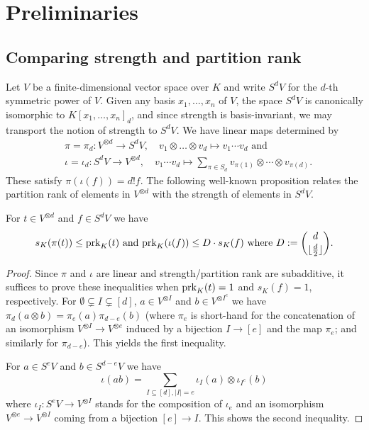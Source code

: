 \documentclass{amsart}
\newcommand{\prk}{\textnormal{prk}}
\newcommand{\floor}[1]{\lfloor #1 \rfloor}
\begin{document}
\section{Preliminaries}
\subsection{Comparing strength and partition rank}

Let $V$ be a finite-dimensional vector space over $K$ and write $S^d V$
for the $d$-th symmetric power of $V$. Given any basis $x_1,\ldots,x_n$ of
$V$, the space $S^d V$ is canonically isomorphic to $K[x_1,\ldots,x_n]_d$,
and since strength is basis-invariant, we may transport the notion of
strength to $S^d V$. We have linear maps determined by 
\begin{align*} 
&\pi=\pi_d: V^{\otimes d} \to S^d V, \quad 
v_1 \otimes \ldots \otimes v_d \mapsto v_1 \cdots v_d  \text{ and}\\
&\iota=\iota_d: S^d V \to V^{\otimes d}, \quad v_1 \cdots v_d \mapsto \sum_{\pi \in S_d}
v_{\pi(1)} \otimes \cdots \otimes v_{\pi(d)}.
\end{align*}
These satisfy $\pi(\iota(f))=d! f$.  The following well-known proposition
relates the partition rank of elements in $V^{\otimes d}$ with the
strength of elements in $S^d V$.

\begin{prop} \label{prop:Sym}
For $t \in V^{\otimes d}$ and $f \in S^d V$ we have
\[ s_K(\pi(t)) \leq \prk_K(t) \text{ and }\prk_K(\iota(f)) \leq
D\cdot s_K(f) \text{ where } D:=\binom{d}{\floor{\frac{d}{2}}}. \]
\end{prop}

\begin{proof}
Since $\pi$ and $\iota$ are linear and strength/partition rank are
subadditive, it suffices to prove these inequalities when $\prk_K(t)=1$
and $s_K(f)=1$, respectively. For $\emptyset \subsetneq I \subsetneq [d]$, $a \in V^{\otimes
I}$ and $b \in V^{\otimes I^c}$
we have $\pi_d(a \otimes b)=\pi_e(a) \pi_{d-e}(b)$ (where $\pi_e$ is
short-hand for the concatenation of an isomorphism $V^{\otimes I} \to V^{\otimes
e}$ induced by a bijection $I \to [e]$ and the map $\pi_e$; and
similarly for $\pi_{d-e}$). This yields the first inequality.

For $a \in S^{e} V$ and $b \in S^{d-e} V$ we have 
\[ \iota(ab)=\sum_{I \subseteq [d],|I|=e} \iota_I(a) \otimes
\iota_{I^c}(b) \]
where $\iota_I: S^e V \to V^{\otimes I}$ stands for the composition of $\iota_e$
and an isomorphism $V^{\otimes e} \to V^{\otimes I}$ coming from a bijection $[e]
\to I$. This shows the second inequality. 
\end{proof}
\end{document}

